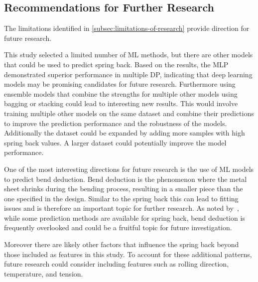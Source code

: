\subsection{Recommendations for Further Research}\label{subsec:recommendations-for-further-research}
The limitations identified in \cref{subsec:limitations-of-research} provide direction for future research.

This study selected a limited number of \ac{ML} methods, but there are other models that could be used to
predict spring back.
Based on the results, the \ac{MLP} demonstrated superior performance in multiple \ac{DP}, indicating that
deep learning models may be promising candidates for future research.
Furthermore using ensemble models that combine the strengths for multiple other models using bagging or stacking
could
lead to interesting new results.
This would involve training multiple other models on the same dataset and combine their predictions to improve the
prediction performance and the robustness of the models.
Additionally the dataset could be expanded by adding more samples with high spring back values.
A larger dataset could potentially improve the model performance.

One of the most interesting directions for future research is the use of \ac{ML} models to predict bend deduction.
Bend deduction is the phenomenon where the metal sheet shrinks during the bending process, resulting in a smaller
piece than the one specified in the design.
Similar to the spring back this can lead to fitting issues and is therefore an important topic for further research.
As noted by~\cite{strano2017fusion}, while some prediction methods are available for spring back, bend deduction is
frequently overlooked and could be a fruitful topic for future investigation.

Moreover there are likely other factors that influence the spring back beyond those included as features in this
study.
To account for these additional patterns, future research could consider including features such as rolling
direction, temperature, and tension.